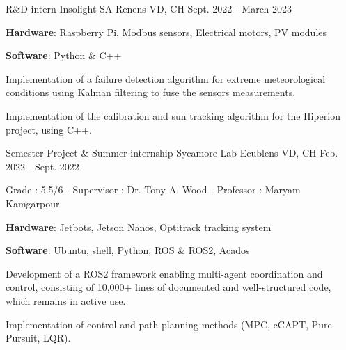 \begin{cventries}
  \cventry
    {R\&D intern} %
    {Insolight SA} %
    {Renens VD, CH} %
    {Sept. 2022 - March 2023} %
    {
      \begin{cvitems} %
        \item \textbf{Hardware}: Raspberry Pi, Modbus sensors, Electrical motors, PV modules
        \item \textbf{Software}: Python \& C++
        \item Implementation of a failure detection algorithm for extreme meteorological conditions using Kalman filtering to fuse the sensors measurements.
        \item Implementation of the calibration and sun tracking algorithm for the Hiperion project, using C++.
      \end{cvitems}
    }
    
  \cventry
    {Semester Project \& Summer internship} %
    {Sycamore Lab} %
    {Ecublens VD, CH} %
    {Feb. 2022 - Sept. 2022} %
    {
    Grade : 5.5/6 - Supervisor : Dr. Tony A. Wood - Professor : Maryam Kamgarpour\vspace{1.5em}
      \begin{cvitems} %
        \item {\textbf{Hardware}: Jetbots, Jetson Nanos, Optitrack tracking system}
        \item {\textbf{Software}: Ubuntu, shell, Python, ROS \& ROS2, Acados}
        \item Development of a ROS2 framework enabling multi-agent coordination and control, consisting of 10,000+ lines of documented and well-structured code, which remains in active use.
        \item Implementation of control and path planning methods (MPC, cCAPT, Pure Pursuit, LQR).
      \end{cvitems}
    }
\end{cventries}
